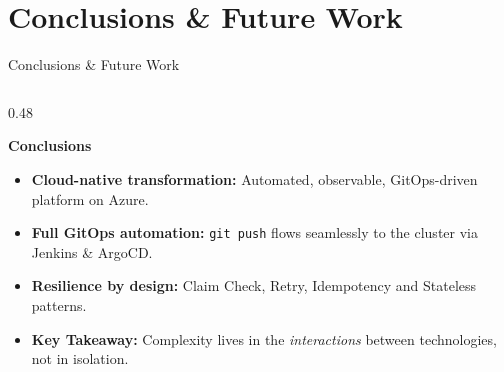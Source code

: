\section{Conclusions \& Future Work}

\begin{frame}{Conclusions \& Future Work}
    \vspace{0.2cm}
    
    \begin{columns}[T]
        \begin{column}{0.48\textwidth}
            \begin{tcolorbox}[colback=white, colframe=gray!30, arc=2pt, boxrule=0.5pt]
                \textbf{\textcolor{blue!70!black}{Conclusions}}\\[0.2cm]
                \scriptsize
                \begin{itemize}
                    \setlength{\itemsep}{6pt}
                    \item \textbf{Cloud-native transformation:} Automated, observable, GitOps-driven platform on Azure.
                    \item \textbf{Full GitOps automation:} \texttt{git push} flows seamlessly to the cluster via Jenkins \& ArgoCD.
                    \item \textbf{Resilience by design:} Claim Check, Retry, Idempotency and Stateless patterns.
                    \item \textcolor{HUAblue}{\textbf{Key Takeaway:}} Complexity lives in the \textit{interactions} between technologies, not in isolation.
                \end{itemize}
            \end{tcolorbox}
        \end{column}
        

\end{columns}
\end{frame}

